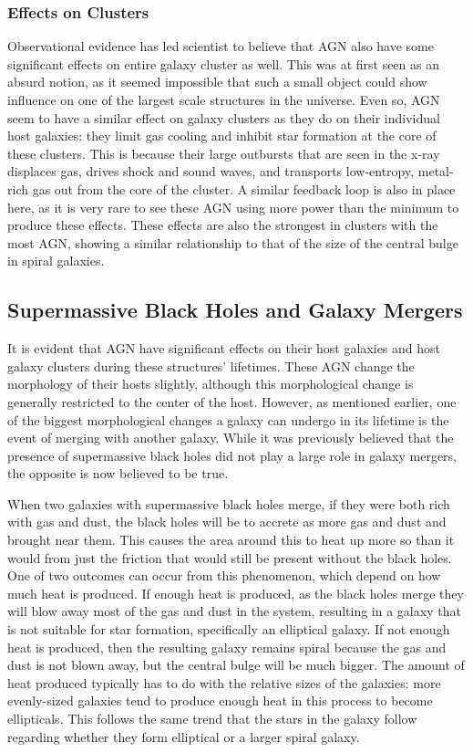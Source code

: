 \documentclass[12pt]{article}
\begin{document}
    \subsubsection{Effects on Clusters}
    Observational evidence has led scientist to believe that AGN also have some
    significant effects on entire galaxy cluster as well.  This was at first
    seen as an absurd notion, as it seemed impossible that such a small object
    could show influence on one of the largest scale structures in the universe.
    Even so, AGN seem to have a similar effect on galaxy clusters as they do on
    their individual host galaxies: they limit gas cooling and inhibit star
    formation at the core of these clusters.  This is because their large
    outbursts that are seen in the x-ray displaces gas, drives shock and sound
    waves, and transports low-entropy, metal-rich gas out from the core of the
    cluster.  A similar feedback loop is also in place here, as it is very rare
    to see these AGN using more power than the minimum to produce these effects.
    These effects are also the strongest in clusters with the most AGN, showing
    a similar relationship to that of the size of the central bulge in spiral
    galaxies.

\subsection{Supermassive Black Holes and Galaxy Mergers}
It is evident that AGN have significant effects on their host galaxies and host
galaxy clusters during these structures' lifetimes.  These AGN change the
morphology of their hosts slightly, although this morphological change is
generally restricted to the center of the host.  However, as mentioned earlier,
one of the biggest morphological changes a galaxy can undergo in its lifetime is
the event of merging with another galaxy.  While it was previously believed that
the presence of supermassive black holes did not play a large role in galaxy
mergers, the opposite is now believed to be true.

When two galaxies with supermassive black holes merge, if they were both
rich with gas and dust, the black holes will be to accrete as more gas and dust
and brought near them.  This causes the area around this to heat up more so than
it would from just the friction that would still be present without the black
holes.  One of two outcomes can occur from this phenomenon, which depend on how
much heat is produced.  If enough heat is produced, as the black holes merge
they will blow away most of the gas and dust in the system, resulting in a
galaxy that is not suitable for star formation, specifically an elliptical
galaxy.  If not enough heat is produced, then the resulting galaxy remains
spiral because the gas and dust is not blown away, but the central bulge will be
much bigger.  The amount of heat produced typically has to do with the relative
sizes of the galaxies: more evenly-sized galaxies tend to produce enough heat in
this process to become ellipticals.  This follows the same trend that the stars
in the galaxy follow regarding whether they form elliptical or a larger spiral
galaxy.
\end{document}

